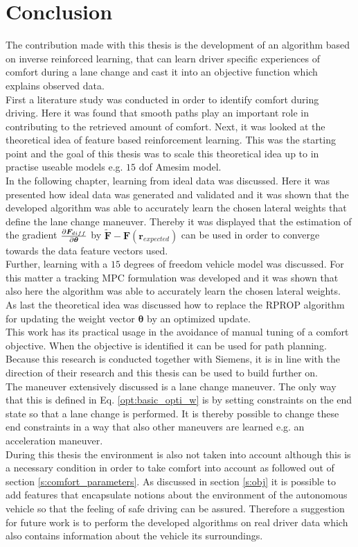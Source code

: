 \chapter{Conclusion}
\label{cha:conclusion}
The contribution made with this thesis is the development of an algorithm based on inverse reinforced learning, that can learn driver specific experiences of comfort during a lane change and cast it into an objective function which explains observed data. \\
First a literature study was conducted in order to identify comfort during driving. Here it was found that smooth paths play an important role in contributing to the retrieved amount of comfort. Next, it was looked at the theoretical idea of feature based reinforcement learning. This was the starting point and the goal of this thesis was to scale this theoretical idea up to in practise useable models e.g. $15$ dof Amesim model.\\
In the following chapter, learning from ideal data was discussed. Here it was presented how ideal data was generated and validated and it was shown that the developed algorithm was able to accurately learn the chosen lateral weights that define the lane change maneuver. Thereby it was displayed that the estimation of the gradient $\pdv{\bm{F}_{diff}}{\bm{\theta}}$ by $ \bm{\tilde{F}} - \bm{F}(\bm{r}_{expected})$ can be used in order to converge towards the data feature vectors used.\\
Further, learning with a $15$ degrees of freedom vehicle model was discussed. For this matter a tracking MPC formulation was developed and it was shown that also here 
the algorithm was able to accurately learn the chosen lateral weights.\\
As last the theoretical idea was discussed how to replace the RPROP algorithm for updating the weight vector $\bm{\theta}$ by an optimized update. \\

This work has its practical usage in the avoidance of manual tuning of a comfort objective. When the objective is identified it can be used for path planning. Because this research is conducted together with Siemens, it is in line with the direction of their research and this thesis can be used to build further on.\\
The maneuver extensively discussed is a lane change maneuver. The only way that this is defined in Eq. \ref{opt:basic_opti_w} is by setting constraints on the end state so that a lane change is performed. It is thereby possible to change these end constraints in a way that also other maneuvers are learned e.g. an acceleration maneuver.\\
During this thesis the environment is also not taken into account although this is a necessary condition in order to take comfort into account as followed out of section \ref{s:comfort_parameters}. As discussed in section \ref{s:obj} it is possible to add features that encapsulate notions about the environment of the autonomous vehicle so that the feeling of safe driving can be assured. Therefore a suggestion for future work is to perform the developed algorithms on real driver data which also contains information about the vehicle its surroundings.



